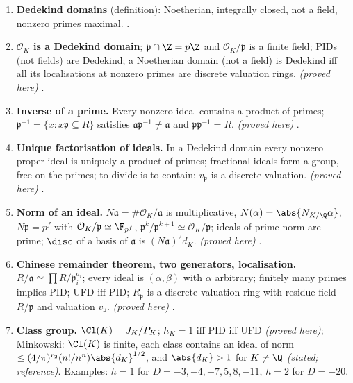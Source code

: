 \begin{enumerate}[label=\textbf{\thechapter.\arabic*}]
$\{\pm1\}$ except $\mu_4$ for $\Q(i)$ and $\mu_6$ for $\Q(\sqrt{-3})$; (iii) $\Z[\sqrt2]^\times=\pm(1+\sqrt2)^\Z$ \emph{((ii), (iii) proved here)}. .
\item \textbf{Dedekind domains} (definition): Noetherian, integrally closed, not a field, nonzero primes maximal. .
\item \textbf{$\mathcal O_K$ is a Dedekind domain}; $\mathfrak p\cap\Z=p\Z$ and $\mathcal O_K/\mathfrak p$ is a finite field; PIDs (not fields) are Dedekind; a Noetherian domain
(not a field) is Dedekind iff all its localisations at nonzero primes are discrete valuation rings. \emph{(proved here)} .
\item \textbf{Inverse of a prime.} Every nonzero ideal contains a product of primes; $\mathfrak p^{-1}=\{x:x\mathfrak p\subseteq R\}$ satisfies $\mathfrak a\mathfrak p^{-1}\ne\mathfrak a$
and $\mathfrak p\mathfrak p^{-1}=R$. \emph{(proved here)} .
\item \textbf{Unique factorisation of ideals.} In a Dedekind domain every nonzero proper ideal is uniquely a product of primes; fractional ideals form a group,
free on the primes; to divide is to contain; $v_{\mathfrak p}$ is a discrete valuation. \emph{(proved here)} .
\item \textbf{Norm of an ideal.} $N\mathfrak a=\#\mathcal O_K/\mathfrak a$ is multiplicative, $N(\alpha)=\abs{N_{K/\Q}\alpha}$, $N\mathfrak p=p^f$ with $\mathcal O_K/\mathfrak p\simeq\F_{p^f}$,
$\mathfrak p^k/\mathfrak p^{k+1}\simeq\mathcal O_K/\mathfrak p$; ideals of prime norm are prime; $\disc$ of a basis of $\mathfrak a$ is $(N\mathfrak a)^2d_K$. \emph{(proved here)}
.
\item \textbf{Chinese remainder theorem, two generators, localisation.} $R/\mathfrak a\simeq\prod R/\mathfrak p_i^{a_i}$; every ideal is $(\alpha,\beta)$ with $\alpha$
arbitrary; finitely many primes implies PID; UFD iff PID; $R_{\mathfrak p}$ is a discrete valuation ring with residue field $R/\mathfrak p$ and valuation $v_{\mathfrak p}$.
\emph{(proved here)} .
\item \textbf{Class group.} $\Cl(K)=J_K/P_K$; $h_K=1$ iff PID iff UFD \emph{(proved here)}; Minkowski: $\Cl(K)$ is finite, each class contains an ideal of norm
$\le(4/\pi)^{r_2}(n!/n^n)\abs{d_K}^{1/2}$, and $\abs{d_K}>1$ for $K\ne\Q$ \emph{(stated; reference)}. Examples: $h=1$ for $D=-3,-4,-7,5,8,-11$, $h=2$ for $D=-20$.

\end{enumerate}

